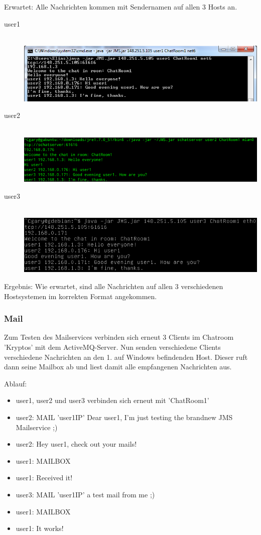 \documentclass[11pt, a4paper]{article}
\begin{document}
Erwartet: Alle Nachrichten kommen mit Sendernamen auf allen 3 Hosts an.

\begin{center}
  \begin{description}
    \item[user1] \hfill \\ \includegraphics[width=5in]{pic/chat_user1.png}
    \item[user2] \hfill \\ \includegraphics[width=5in]{pic/chat_user2.png}
    \item[user3] \hfill  \\ \includegraphics[width=5in]{pic/chat_user3.png}
  \end{description}
\end{center}

Ergebnis: Wie erwartet, sind alle Nachrichten auf allen 3 verschiedenen Hostsystemen im korrekten Format angekommen.

\subsubsection{Mail}
Zum Testen des Mailservices verbinden sich erneut 3 Clients im Chatroom 'Kryptos' mit dem ActiveMQ-Server.
Nun senden verschiedene Clients verschiedene Nachrichten an den 1. auf Windows befindenden Host.
Dieser ruft dann seine Mailbox ab und liest damit alle empfangenen Nachrichten aus.

Ablauf:
\begin{itemize}
	\item user1, user2 und user3 verbinden sich erneut mit 'ChatRoom1'
	\item user2: MAIL 'user1IP' Dear user1, I'm just testing the brandnew JMS Mailservice ;)
	\item user2: Hey user1, check out your mails!
	\item user1: MAILBOX
	\item user1: Received it!
	\item user3: MAIL 'user1IP' a test mail from me ;)
	\item user1: MAILBOX
	\item user1: It works!
\end{itemize}
\end{document}
